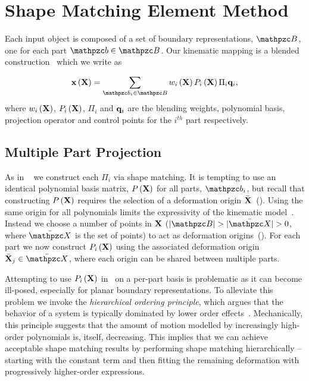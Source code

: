\section{Shape Matching Element Method}
 Each input object is composed of a set of boundary representations, $\Prts$, one for each part $\prt\in\Prts$. 
 Our kinematic mapping is a blended construction~\cite{10.1145/2614028.2615427,blendedFORKS2016} which we write as

 \begin{equation}
    \defX\left(\refX\right) = \sum_{\prt_i\in\Prts} \bldxi\Pmatxi\Pi_i\vc{q}_i, 
    \label{eq:kinematics}
 \end{equation} where $w_i\left(\mathbf{X}\right)$, $P_i\left(\mathbf{X} \right)$, $\Pi_i$ and $\mathbf{q}_i$ are the blending weights, polynomial basis, projection operator and control points for the $i^{th}$
 part respectively.  
 
 \subsection*{Multiple Part Projection}
As in ~ we construct each $\Pi_i$ via shape matching. 
It is tempting to use an identical polynomial basis matrix, $P\left(\mathbf{X}\right)$ for all parts, $\prt_i$, but recall that constructing $P\left(\mathbf{X}\right)$ requires the selection of a deformation
origin $\bar{\mathbf{X}}$~(). 
Using the same origin for all polynomials limits the expressivity of the kinematic model~\cite{STBS:2011}.
Instead we choose a number of points in $\mathbf{X}$ ($|\Prts| > |\XBs| > 0$, where $\XBs$ is the set of points)  to act as deformation origins~().
For each part we now construct $P_i\left(\mathbf{X} \right)$ using the associated deformation origin $\bar{\refX}_j\in \XBs$, where each origin can
be shared between multiple parts.

Attempting to use $P_i\left(\mathbf{X} \right)$ in~ on a per-part basis is problematic as it can become ill-posed, especially for planar boundary representations. 
To alleviate this problem we invoke the \emph{hierarchical ordering principle}, which argues that the behavior of a system is typically 
dominated by lower order effects~\cite{li2006regularities}. 
Mechanically, this principle suggests that the amount of motion modelled by increasingly high-order polynomials is, itself, decreasing. 
This implies that we can achieve acceptable shape matching results by performing shape matching hierarchically -- starting with the constant term and then 
fitting the remaining deformation with progressively higher-order expressions. 

